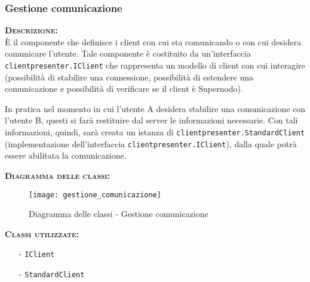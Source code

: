 \subsubsection{Gestione comunicazione}
\begin{description}
	\item{\scshape\bfseries Descrizione:}\\
È il componente che definisce i client con cui sta comunicando o con cui desidera comunicare l'utente. Tale componente è costituito da un'interfaccia \texttt{clientpresenter.IClient} che rappresenta un modello di client con cui interagire (possibilità di stabilire una connessione, possibilità di estendere una comunicazione e possibilità di verificare se il client è Supernodo).

In pratica nel momento in cui l'utente A desidera stabilire una comunicazione con l'utente B, questi si farà restituire dal server le informazioni necessarie. Con tali informazioni, quindi, sarà creata un istanza di \texttt{clientpresenter.StandardClient} (implementazione dell'interfaccia \texttt{clientpresenter.IClient}), dalla quale potrà essere abilitata la comunicazione.
	\item{\scshape\bfseries Diagramma delle classi:}
	\begin{figure}[H]
\begin{center}
\texttt{[image: gestione\_comunicazione]}
\caption{Diagramma delle classi - Gestione comunicazione}\label{fig:gestione_comunicazione}
\end{center}
\end{figure}
	\item{\scshape\bfseries Classi utilizzate:} 
	\begin{itemize}[noitemsep,nolistsep]
		\item[-] \texttt{IClient}
		\item[-] \texttt{StandardClient}
	\end{itemize}  
\end{description}

